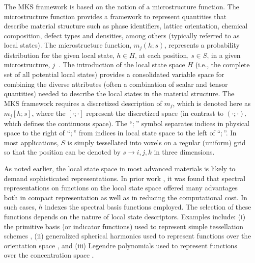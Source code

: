 \documentclass{bmcart}
\begin{document}
The MKS framework is based on the notion of a microstructure function.
The microstructure function provides a framework to represent
quantities that describe material structure such as phase identifiers,
lattice orientation, chemical composition, defect types and densities,
among others (typically referred to as local states). The
microstructure function, $m_j \left(h; s\right)$, represents a
probability distribution for the given local state, $h \in H$, at each
position, $s \in S$, in a given microstructure,
$j$~\cite{niezgoda2013novel, niezgoda2011understanding,
  qidwai2012estimating, niezgoda2010optimized}. The introduction of
the local state space $H$ (i.e., the complete set of all potential
local states) provides a consolidated variable space for combining the
diverse attributes (often a combination of scalar and tensor
quantities) needed to describe the local states in the material
structure.  The MKS framework requires a discretized description of
$m_j$, which is denoted here as $m_j\left[h; s\right]$, where the
$\left[\cdot;\cdot\right]$ represent the discretized space (in
contrast to $\left(\cdot;\cdot\right)$, which defines the continuous
space).  The ``$;$'' symbol separates indices in physical space to the
right of ``$;$'' from indices in local state space to the left of
``$;$''. In most applications, $S$ is simply tessellated into voxels
on a regular (uniform) grid so that the position can be denoted by
$s\rightarrow i,j,k$ in three dimensions.

As noted earlier, the local state space in most advanced materials is
likely to demand sophisticated representations. In prior work
\cite{yabansu2014calibrated, yabansu2015representation,
brough2016microstructure}, it was found that spectral
representations on functions on the local state space offered many
advantages both in compact representation as well as in reducing the
computational cost. In such cases, $h$ indexes the spectral basis
functions employed. The selection of these functions depends on the
nature of local state descriptors. Examples include: (i) the primitive
basis (or indicator functions) used to represent simple tessellation
schemes \cite{landi2010multi, kalidindi2010novel, al2012multi,
kalidindi2011microstructure, gupta2015structure, cceccen2014data,
niezgoda2013novel, niezgoda2011understanding, cecen2016versatile},
(ii) generalized spherical harmonics used to represent functions over
the orientation space \cite{yabansu2014calibrated,
yabansu2015representation}, and (iii) Legendre polynomials used to
represent functions over the concentration space
\cite{brough2016microstructure}.
\end{document}

